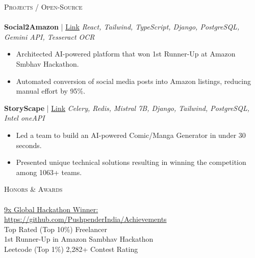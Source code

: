 \documentclass[a4paper]{article}
\newcommand{\header}[1]{
  {\hspace*{-18pt}\vspace*{6pt} \textsc{#1}}
  \vspace*{-6pt} \\ \hspace*{-18pt}\hrulefill \\}
\begin{document}
\header{Projects / Open-Source}
\textbf{Social2Amazon} | \href{https://amazonsmbhav2024.hackerearth.com/}{Link} \hfill{\sl React, Tailwind, TypeScript, Django, PostgreSQL, Gemini API, Tesseract OCR}\\
\begin{itemize}
\item Architected AI-powered platform that won 1st Runner-Up at Amazon Smbhav Hackathon.
\item Automated conversion of social media posts into Amazon listings, reducing manual effort by 95\%.
\end{itemize}

\textbf{StoryScape} | \href{https://devpost.com/software/storyscape-znf1xm}{Link} \hfill{\sl Celery, Redis, Mistral 7B, Django, Tailwind, PostgreSQL, Intel oneAPI}\\
\begin{itemize}
\item Led a team to build an AI-powered Comic/Manga Generator in under 30 seconds.
\item Presented unique technical solutions resulting in winning the competition among 1063+ teams.
\end{itemize}

\header{Honors \& Awards}
\href{https://github.com/PushpenderIndia/Achievements}{9x Global Hackathon Winner: https://github.com/PushpenderIndia/Achievements}\\

Top Rated (Top 10\%) Freelancer\\
1st Runner-Up in Amazon Sambhav Hackathon\\
Leetcode (Top 1\%) 2,282+ Contest Rating\\
\end{document}
